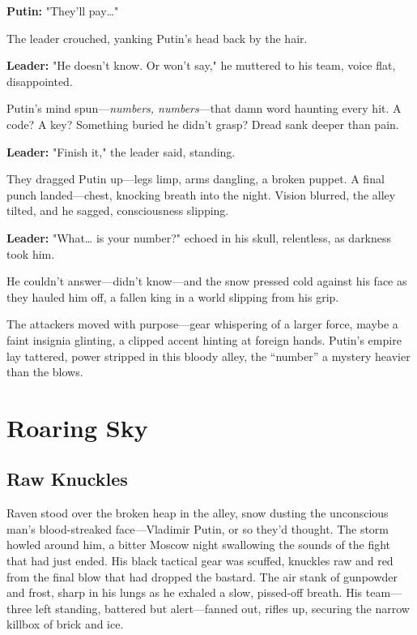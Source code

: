 \documentclass[12pt]{book}
\begin{document}
\vspace{0.5em}
\textbf{Putin:} "They’ll pay…"

The leader crouched, yanking Putin’s head back by the hair.

\vspace{0.5em}
\textbf{Leader:} "He doesn’t know. Or won’t say," he muttered to his team, voice flat, disappointed.

Putin’s mind spun—\emph{numbers, numbers}—that damn word haunting every hit. A code? A key? Something buried he didn’t grasp? Dread sank deeper than pain.

\vspace{0.5em}
\textbf{Leader:} "Finish it," the leader said, standing.

They dragged Putin up—legs limp, arms dangling, a broken puppet. A final punch landed—chest, knocking breath into the night. Vision blurred, the alley tilted, and he sagged, consciousness slipping.

\vspace{0.5em}
\textbf{Leader:} "What… is your number?" echoed in his skull, relentless, as darkness took him.

He couldn’t answer—didn’t know—and the snow pressed cold against his face as they hauled him off, a fallen king in a world slipping from his grip.

The attackers moved with purpose—gear whispering of a larger force, maybe a faint insignia glinting, a clipped accent hinting at foreign hands. Putin’s empire lay tattered, power stripped in this bloody alley, the \enquote{number} a mystery heavier than the blows.

\chapter{Roaring Sky}

\section{Raw Knuckles}
Raven stood over the broken heap in the alley, snow dusting the unconscious man’s blood-streaked face—Vladimir Putin, or so they’d thought. The storm howled around him, a bitter Moscow night swallowing the sounds of the fight that had just ended. His black tactical gear was scuffed, knuckles raw and red from the final blow that had dropped the bastard. The air stank of gunpowder and frost, sharp in his lungs as he exhaled a slow, pissed-off breath. His team—three left standing, battered but alert—fanned out, rifles up, securing the narrow killbox of brick and ice.
\end{document}
